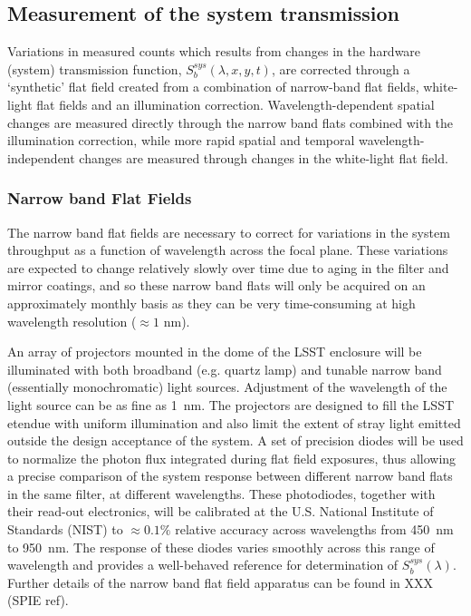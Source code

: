 \documentclass[12pt,preprint]{aastex}
\begin{document}
\subsection{Measurement of the system transmission}

Variations in measured counts which results from changes in the hardware
(system) transmission function, $S_b^{sys}(\lambda,x,y,t)$, are corrected
through a `synthetic' flat field created from a combination of
narrow-band flat fields, white-light flat fields and an illumination correction.
Wavelength-dependent spatial changes are measured directly through the
narrow band flats combined with the illumination correction, while
more rapid spatial and temporal wavelength-independent changes are
measured through changes in the white-light flat field.

\subsubsection{Narrow band Flat Fields}
\label{sec:narrowband}

The narrow band flat fields are necessary to correct for variations in
the system throughput as a function of wavelength across the focal
plane. These variations are expected to change relatively slowly over
time due to aging in the filter and mirror coatings, and so these
narrow band flats will only be acquired on an approximately monthly
basis as they can be very time-consuming at high wavelength resolution
($\approx1$ nm).

An array of projectors mounted in the dome of the LSST enclosure will
be illuminated with both broadband (e.g. quartz lamp) and tunable
narrow band (essentially monochromatic) light sources.  Adjustment of
the wavelength of the light source can be as fine as 1~nm. The
projectors are designed to fill the LSST etendue with uniform
illumination and also limit the extent of stray light emitted outside
the design acceptance of the system. A set of precision diodes will be
used to normalize the photon flux integrated during flat field
exposures, thus allowing a precise comparison of the system response
between different narrow band flats in the same filter, at different
wavelengths.  These photodiodes, together with their read-out
electronics, will be calibrated at the U.S. National Institute of
Standards (NIST) to $\approx0.1\%$ relative accuracy across
wavelengths from 450~nm to 950~nm. The response of these diodes varies
smoothly across this range of wavelength and provides a well-behaved
reference for determination of $S_b^{sys}(\lambda)$.  Further details
of the narrow band flat field apparatus can be
found in XXX (SPIE ref). 
\end{document}
